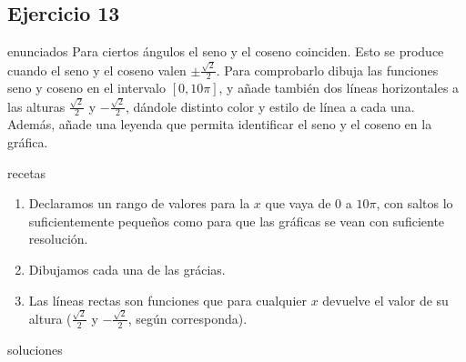 \subsection{Ejercicio 13}
\def\parte{enunciados}
\ifx\capitulo\parte
Para ciertos ángulos el seno y el coseno coinciden. Esto se produce cuando el seno y el coseno valen $\pm \frac{\sqrt{2}}{2}$. Para comprobarlo dibuja las funciones seno y coseno en el intervalo $[0, 10\pi]$, y añade también dos líneas horizontales a las alturas $\frac{\sqrt{2}}{2}$ y $-\frac{\sqrt{2}}{2}$, dándole distinto color y estilo de línea a cada una. Además, añade una leyenda que permita identificar el seno y el coseno en la gráfica.
\fi

\def\parte{recetas}
\ifx\capitulo\parte
\begin{enumerate}
\item Declaramos un rango de valores para la $x$ que vaya de 0 a $10\pi$, con saltos lo suficientemente pequeños como para que las gráficas se vean con suficiente resolución.
\item Dibujamos cada una de las grácias.
\item Las líneas rectas son funciones que para cualquier $x$ devuelve el valor de su altura ($\frac{\sqrt{2}}{2}$ y $-\frac{\sqrt{2}}{2}$, según corresponda).
\end{enumerate}
\fi

\def\parte{soluciones}
\ifx\capitulo\parte

\fi
